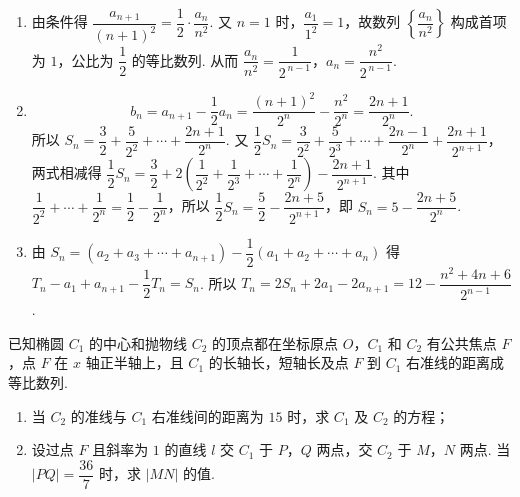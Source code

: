 \begin{solution}
\begin{enumerate}
\item 由条件得 \(\dfrac{a_{n+1}}{(n+1)^2}=\dfrac12\cdot\dfrac{a_n}{n^2}\). 又 \(n=1\) 时，\(\dfrac{a_1}{1^2}=1\)，故数列 \(\left\{\dfrac{a_n}{n^2}\right\}\) 构成首项为 \(1\)，公比为 \(\dfrac12\) 的等比数列. 从而 \(\dfrac{a_n}{n^2}=\dfrac1{2^{\,n-1}}\)，\(a_n=\dfrac{n^2}{2^{\,n-1}}\).

\item \[b_n=a_{n+1}-\dfrac12a_n=\dfrac{(n+1)^2}{2^n}-\dfrac{n^2}{2^n}=\dfrac{2n+1}{2^n}.\]
所以 \(S_n=\dfrac32+\dfrac5{2^2}+\cdots+\dfrac{2n+1}{2^n}\). 又 \(\dfrac12S_n=\dfrac3{2^2}+\dfrac5{2^3}+\cdots+\dfrac{2n-1}{2^n}+\dfrac{2n+1}{2^{n+1}}\)，两式相减得
\(\dfrac12S_n=\dfrac32+2\left(\dfrac1{2^2}+\dfrac1{2^3}+\cdots+\dfrac1{2^n}\right)-\dfrac{2n+1}{2^{n+1}}\).
其中 \(\dfrac1{2^2}+\cdots+\dfrac1{2^n}=\dfrac12-\dfrac1{2^n}\)，所以
\(\dfrac12S_n=\dfrac52-\dfrac{2n+5}{2^{n+1}}\)，即 \(S_n=5-\dfrac{2n+5}{2^n}\).

\item 由 \(S_n=(a_2+a_3+\cdots+a_{n+1})-\dfrac12(a_1+a_2+\cdots+a_n)\) 得 \(T_n-a_1+a_{n+1}-\dfrac12T_n=S_n\). 所以 \(T_n=2S_n+2a_1-2a_{n+1}=12-\dfrac{n^2+4n+6}{2^{n-1}}\).
\end{enumerate}
\end{solution}

\begin{problem}
已知椭圆 \(C_1\) 的中心和抛物线 \(C_2\) 的顶点都在坐标原点 \(O\)，\(C_1\) 和 \(C_2\) 有公共焦点 \(F\)，点 \(F\) 在 \(x\) 轴正半轴上，且 \(C_1\) 的长轴长，短轴长及点 \(F\) 到 \(C_1\) 右准线的距离成等比数列.

\begin{enumerate}
\item 当 \(C_2\) 的准线与 \(C_1\) 右准线间的距离为 \(15\) 时，求 \(C_1\) 及 \(C_2\) 的方程；
\item 设过点 \(F\) 且斜率为 \(1\) 的直线 \(l\) 交 \(C_1\) 于 \(P\)，\(Q\) 两点，交 \(C_2\) 于 \(M\)，\(N\) 两点. 当 \(|PQ|=\dfrac{36}{7}\) 时，求 \(|MN|\) 的值.
\end{enumerate}
\end{problem}


